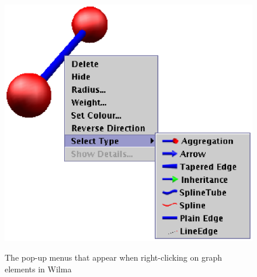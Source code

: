 \documentclass[runningheads]{cl2emult}
\begin{document}
\begin{figure}
{{    \includegraphics{figures/edgemenu.eps}}}
  \caption{The pop-up menus that appear when right-clicking on graph
  elements in Wilma}
\end{figure}
\end{document}
